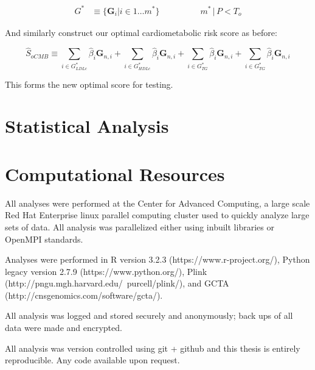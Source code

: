 $$ \begin{aligned} G^* &\equiv \{ \mathbf{G}_i | i \in 1 \dots m^* \} &&&&&& m^* \, |  \, P < T_{o} \end{aligned}$$

And similarly construct our optimal cardiometabolic risk score as before:


$$ \hat{S}_{oCMB} \equiv \sum_{i \in G^*_{LDLc}} \hat{\beta}_i \mathbf{G}_{n, i} + \sum_{i \in G^*_{HDLc}} \hat{\beta}_i \mathbf{G}_{n, i} + \sum_{i \in G^*_{TG}} \hat{\beta}_i \mathbf{G}_{n, i} + \sum_{i \in G^*_{TG}} \hat{\beta}_i \mathbf{G}_{n, i} $$

This forms the new optimal score for testing.

\section{Statistical Analysis}


\section{Computational Resources}

All analyses were performed at the Center for Advanced Computing, a large scale Red Hat Enterprise linux parallel computing cluster used to quickly analyze large sets of data. All analysis was parallelized either using inbuilt libraries or OpenMPI standards. 

Analyses were performed in R version 3.2.3 (https://www.r-project.org/), Python legacy version 2.7.9 (https://www.python.org/), Plink (http://pngu.mgh.harvard.edu/~purcell/plink/), and GCTA (http://cnsgenomics.com/software/gcta/).

All analysis was logged and stored securely and anonymously; back ups of all data were made and encrypted.

All analysis was version controlled using git + github and this thesis is entirely reproducible. Any code available upon request. 
